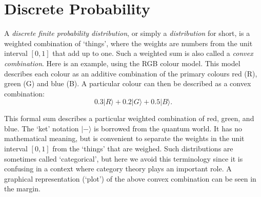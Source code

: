 \documentclass[leqno]{tufte-book} %
\newcommand{\ket}[1]{\ensuremath{|#1\rangle}}
\begin{document}

\mainmatter


\chapter{Discrete Probability}\label{ch:dp}

A \emph{discrete finite probability distribution},
or simply a \emph{distribution} for short, is a weighted combination
of `things', where the weights are numbers from the unit interval
$[0,1]$ that add up to one. Such a weighted sum is also called a
\emph{convex combination}. Here is an
example, using the RGB colour model.  This model describes each colour
as an additive combination of the primary colours red (R), green (G)
and blue (B). A particular colour can then be described as a convex
combination:
$$0.3\ket{R} + 0.2\ket{G} + 0.5\ket{B}.$$

\noindent This formal sum describes a particular weighted combination
of red, green, and blue. The `ket' notation $\ket{-}$ is borrowed from
the quantum world. It has no mathematical meaning, but is convenient
to separate the weights in the unit interval $[0,1]$ from the `things'
that are weighed. Such distributions are sometimes called
`categorical',
but here we avoid this terminology since it is confusing in a context
where category theory plays an important role. A graphical
representation (`plot') of the above convex combination can be seen in
the
margin.
\end{document}
